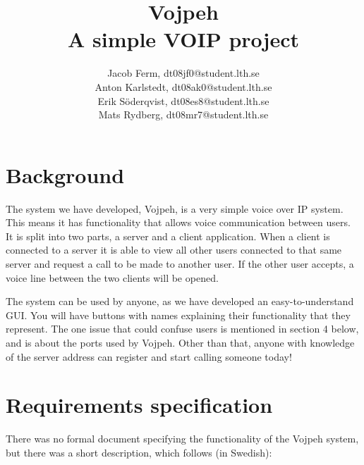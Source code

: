 \documentclass[a4paper,titlepage]{article}
\title{\Huge{Vojpeh} \\ \Large{A simple VOIP project}}
\author{Jacob Ferm, dt08jf0@student.lth.se \\
	Anton Karlstedt, dt08ak0@student.lth.se \\
	Erik Söderqvist, dt08es8@student.lth.se \\
	Mats Rydberg, dt08mr7@student.lth.se 
	}
\begin{document}
\maketitle

\section{Background}
The system we have developed, Vojpeh, is a very simple voice over IP system. This means it has functionality that allows voice communication between users. It is split into two parts, a server and a client application. When a client is connected to a server it is able to view all other users connected to that same server and request a call to be made to another user. If the other user accepts, a voice line between the two clients will be opened.

The system can be used by anyone, as we have developed an easy-to-understand GUI. You will have buttons with names explaining their functionality that they represent. The one issue that could confuse users is mentioned in section 4 below, and is about the ports used by Vojpeh. Other than that, anyone with knowledge of the server address can register and start calling someone today!

\section{Requirements specification}
There was no formal document specifying the functionality of the Vojpeh system, but there was a short description, which follows (in Swedish):
\end{document}
